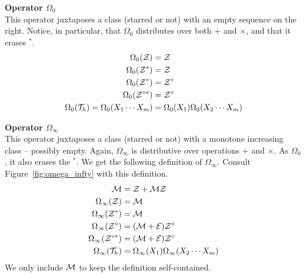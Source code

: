 \documentclass[12pt, a4paper, twoside]{report}
\begin{document}
\noindent\textbf{Operator $\Omega_0$}\\
This operator juxtaposes a class (starred or not) with an empty sequence on the right. Notice, in particular, that $\Omega_0$ distributes over both $+$ and $\times$, and that it erases ${}^*$. 
\begin{align}
  \begin{aligned}
  \Omega_0(\mathcal{Z}) &= \mathcal{Z}\\
  \Omega_0(\mathcal{Z}^*) &= \mathcal{Z}\\
  \Omega_0(\mathcal{Z}^\circ) &= \mathcal{Z}^\circ\\
  \Omega_0(\mathcal{Z}^{\circ*}) &= \mathcal{Z}^{\circ}\\
  \Omega_0(\mathcal{T}_h) = \Omega_0(X_1\cdots X_m) &= \Omega_0(X_1)\Omega_0(X_2\cdots X_m)
\end{aligned}
\end{align}

\noindent\textbf{Operator $\Omega_\infty$}\\
This operator juxtaposes a class (starred or not) with a monotone increasing class -- possibly empty. Again, $\Omega_\infty$ is distributive over operations $+$ and $\times$. As $\Omega_0$, it also erases the ${}^*$. We get the following definition of $\Omega_\infty$. Consult Figure~\ref{fig:omega_infty} with this definition.
\begin{align}
  \begin{aligned}
  \mathcal{M} &= \mathcal{Z} + \mathcal{M}\mathcal{Z}\\
  \Omega_\infty(\mathcal{Z}) &= \mathcal{M}\\
  \Omega_\infty(\mathcal{Z}^*) &= \mathcal{M}\\
  \Omega_\infty(\mathcal{Z}^\circ) &= (\mathcal{M}+\mathcal{E})\mathcal{Z}^\circ\\
  \Omega_\infty(\mathcal{Z}^{\circ*}) &= (\mathcal{M}+\mathcal{E})\mathcal{Z}^\circ\\
  \Omega_\infty(\mathcal{T}_h) &= \Omega_\infty(X_1)\Omega_\infty(X_2\cdots X_m)
\end{aligned}
                        \label{eq:iterjuxt_omegainfty}
\end{align}
We only include $\mathcal{M}$ to keep the definition self-contained.
\end{document}
